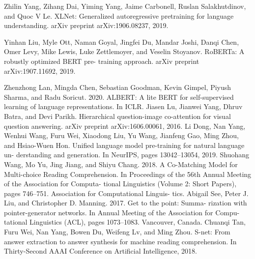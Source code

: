 \documentclass{article}
\begin{document}
\begin{multicols}{2}
\begin{thebibliography}{99}
    Zhilin Yang, Zihang Dai, Yiming Yang, Jaime Carbonell, Ruslan Salakhutdinov, and Quoc V
    Le. XLNet: Generalized autoregressive pretraining for language understanding. arXiv preprint
    arXiv:1906.08237, 2019.

    Yinhan Liu, Myle Ott, Naman Goyal, Jingfei Du, Mandar Joshi, Danqi Chen, Omer Levy, Mike
    Lewis, Luke Zettlemoyer, and Veselin Stoyanov. RoBERTa: A robustly optimized BERT pre-
    training approach. arXiv preprint arXiv:1907.11692, 2019.

    Zhenzhong Lan, Mingda Chen, Sebastian Goodman,
    Kevin Gimpel, Piyush Sharma, and Radu Soricut.
    2020. ALBERT: A lite BERT for self-supervised
    learning of language representations. In ICLR.
    Jiasen Lu, Jianwei Yang, Dhruv Batra, and Devi Parikh. Hierarchical question-image co-attention
    for visual question answering. arXiv preprint arXiv:1606.00061, 2016.
    Li Dong, Nan Yang, Wenhui Wang, Furu Wei, Xiaodong Liu,
    Yu Wang, Jianfeng Gao, Ming Zhou, and Hsiao-Wuen Hon.
    Unified language model pre-training for natural language un-
    derstanding and generation. In NeurIPS, pages 13042–13054,
    2019.
    Shuohang Wang, Mo Yu, Jing Jiang, and Shiyu Chang.
    2018. A Co-Matching Model for Multi-choice
    Reading Comprehension. In Proceedings of the 56th
    Annual Meeting of the Association for Computa-
    tional Linguistics (Volume 2: Short Papers), pages
    746–751. Association for Computational Linguis-
    tics.
    Abigail See, Peter J. Liu, and Christopher D.
    Manning. 2017. Get to the point: Summa-
    rization with pointer-generator networks. In
    Annual Meeting of the Association for Compu-
    tational Linguistics (ACL), pages 1073–1083.
    Vancouver, Canada.
    Chuanqi Tan, Furu Wei, Nan Yang, Bowen Du, Weifeng Lv, and Ming Zhou. S-net: From
    answer extraction to answer synthesis for machine reading comprehension. In Thirty-Second
    AAAI Conference on Artificial Intelligence, 2018.






\end{thebibliography}
\end{multicols}
\end{document}
